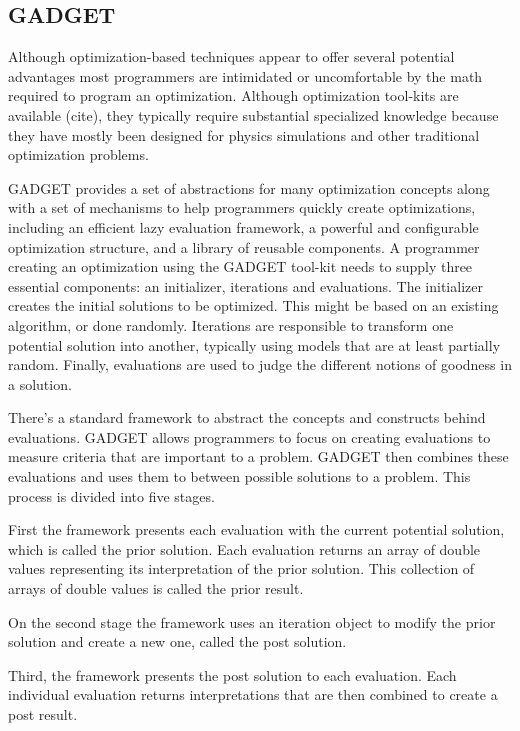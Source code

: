 \subsection{GADGET}
\label{subsection:GADGET}

Although optimization-based techniques appear to offer several potential advantages most programmers are intimidated or uncomfortable by the math required to program an optimization. Although optimization tool-kits are available (cite), they typically require substantial specialized knowledge because they have mostly been designed for physics simulations and other traditional optimization problems.

GADGET provides a set of abstractions for many optimization concepts along with a set of mechanisms to help programmers quickly create optimizations, including an efficient lazy evaluation framework, a powerful and configurable optimization structure, and a library of reusable components.
A programmer creating an optimization using the GADGET tool-kit needs to supply three essential components: an initializer, iterations and evaluations. The initializer creates the initial solutions to be optimized. This might be based on an existing algorithm, or done randomly. Iterations are responsible to transform one potential solution into another, typically using models that are at least partially random. Finally, evaluations are used to judge the different notions of goodness in a solution.

There’s a standard framework to abstract the concepts and constructs behind evaluations. GADGET allows programmers to focus on creating evaluations to measure criteria that are important to a problem. GADGET then combines these evaluations and uses them to between possible solutions to a problem. This process is divided into five stages. 

First the framework presents each evaluation with the current potential solution, which is called the prior solution. Each evaluation returns an array of double values representing its interpretation of the prior solution. This collection of arrays of double values is called the prior result. 

On the second stage the framework uses an iteration object to modify the prior solution and create a new one, called the post solution.

Third, the framework presents the post solution to each evaluation. Each individual evaluation returns interpretations that are then combined to create a post result.

